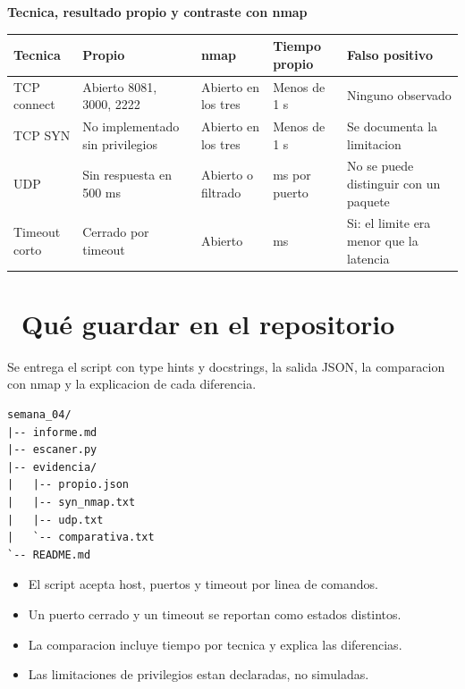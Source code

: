 \documentclass[11pt,a4paper]{article}
\newcommand{\iconotexto}[2]{\textcolor{cyanNeon}{\faIcon{#1}}~#2}
\begin{document}
\begin{center}
\begin{minipage}{\linewidth}
\centering
{\footnotesize
\textbf{Tecnica, resultado propio y contraste con nmap}\par\smallskip
\begin{tabular}{@{}>{\raggedright\arraybackslash}p{2.60cm}>{\raggedright\arraybackslash}p{1.80cm}>{\raggedright\arraybackslash}p{1.80cm}>{\raggedright\arraybackslash}p{2.20cm}>{\raggedright\arraybackslash}p{3.60cm}@{}}
\toprule
\textbf{Tecnica} & \textbf{Propio} & \textbf{nmap} & \textbf{Tiempo propio} & \textbf{Falso positivo} \\
\midrule
TCP connect & Abierto 8081, 3000, 2222 & Abierto en los tres & Menos de 1 s & Ninguno observado \\
TCP SYN & No implementado sin privilegios & Abierto en los tres & Menos de 1 s & Se documenta la limitacion \\
UDP & Sin respuesta en 500 ms & Abierto o filtrado & 500 ms por puerto & No se puede distinguir con un paquete \\
Timeout corto & Cerrado por timeout & Abierto & 50 ms & Si: el limite era menor que la latencia \\
\bottomrule
\end{tabular}
}
\par{}
\end{minipage}
\end{center}

\section{\iconotexto{box-open}{Qué guardar en el repositorio}}

Se entrega el script con type hints y docstrings, la salida JSON, la comparacion con nmap y la explicacion de cada diferencia.

\begin{lstlisting}[style=estiloCodigo]
semana_04/
|-- informe.md
|-- escaner.py
|-- evidencia/
|   |-- propio.json
|   |-- syn_nmap.txt
|   |-- udp.txt
|   `-- comparativa.txt
`-- README.md
\end{lstlisting}

\begin{itemize}[leftmargin=1.4em,itemsep=2pt,topsep=3pt]
  \item El script acepta host, puertos y timeout por linea de comandos.
  \item Un puerto cerrado y un timeout se reportan como estados distintos.
  \item La comparacion incluye tiempo por tecnica y explica las diferencias.
  \item Las limitaciones de privilegios estan declaradas, no simuladas.
\end{itemize}
\end{document}
